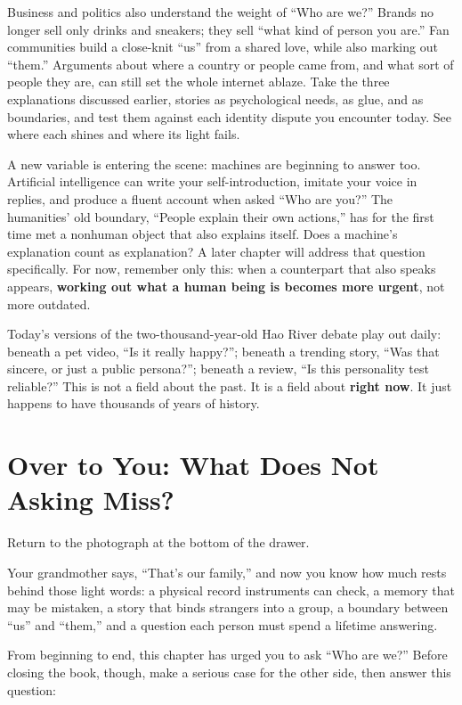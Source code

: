 Business and politics also understand the weight of ``Who are we?'' Brands no longer sell only drinks and sneakers; they sell ``what kind of person you are.'' Fan communities build a close-knit ``us'' from a shared love, while also marking out ``them.'' Arguments about where a country or people came from, and what sort of people they are, can still set the whole internet ablaze. Take the three explanations discussed earlier, stories as psychological needs, as glue, and as boundaries, and test them against each identity dispute you encounter today. See where each shines and where its light fails.

A new variable is entering the scene: machines are beginning to answer too. Artificial intelligence can write your self-introduction, imitate your voice in replies, and produce a fluent account when asked ``Who are you?'' The humanities' old boundary, ``People explain their own actions,'' has for the first time met a nonhuman object that also explains itself. Does a machine's explanation count as explanation? A later chapter will address that question specifically. For now, remember only this: when a counterpart that also speaks appears, \textbf{working out what a human being is becomes more urgent}, not more outdated.

Today's versions of the two-thousand-year-old Hao River debate play out daily: beneath a pet video, ``Is it really happy?''; beneath a trending story, ``Was that sincere, or just a public persona?''; beneath a review, ``Is this personality test reliable?'' This is not a field about the past. It is a field about \textbf{right now}. It just happens to have thousands of years of history.

\section{Over to You: What Does Not Asking Miss?}
Return to the photograph at the bottom of the drawer.

Your grandmother says, ``That's our family,'' and now you know how much rests behind those light words: a physical record instruments can check, a memory that may be mistaken, a story that binds strangers into a group, a boundary between ``us'' and ``them,'' and a question each person must spend a lifetime answering.

From beginning to end, this chapter has urged you to ask ``Who are we?'' Before closing the book, though, make a serious case for the other side, then answer this question:

